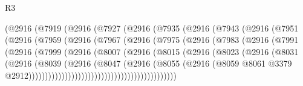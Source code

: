 \begin{lexlean}{R3}
\begin{coremodule}
                  (@2916
                    (@7919
                      (@2916
                        (@7927
                          (@2916
                            (@7935
                              (@2916
                                (@7943
                                  (@2916
                                    (@7951
                                      (@2916
                                        (@7959
                                          (@2916
                                            (@7967
                                              (@2916
                                                (@7975
                                                  (@2916
                                                    (@7983
                                                      (@2916
                                                        (@7991
                                                          (@2916
                                                            (@7999
                                                              (@2916
                                                                (@8007
                                                                  (@2916
                                                                    (@8015
                                                                      (@2916
                                                                        (@8023
                                                                          (@2916
                                                                            (@8031
                                                                              (@2916
                                                                                (@8039
                                                                                  (@2916
                                                                                    (@8047
                                                                                      (@2916
                                                                                        (@8055
                                                                                          (@2916
                                                                                            (@8059
                                                                                              @8061
                                                                                              @3379
                                                                                              @2912)))))))))))))))))))))))))))))))))))))))))))))

\end{coremodule}
\end{lexlean}

